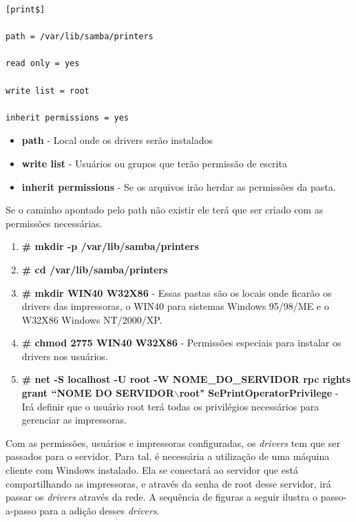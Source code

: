 \begin{lstlisting}[caption=Variáveis para compartilhamento onde deverão ficar os \textit{drivers} das impressoras,label={smb_print_driver}]	
[print$]

path = /var/lib/samba/printers

read only = yes

write list = root

inherit permissions = yes	
\end{lstlisting}

\begin{itemize}
	\item \textbf{path} - Local onde os drivers serão instalados
	\item \textbf{write list} - Usuários ou grupos que terão permissão de escrita
	\item \textbf{inherit permissions} - Se os arquivos irão herdar as permissões da pasta.
\end{itemize}

Se o caminho apontado pelo path não existir ele terá que ser criado com as permissões necessárias.

\begin{enumerate}
	\item \textbf{\# mkdir -p /var/lib/samba/printers}
	
	\item \textbf{\# cd /var/lib/samba/printers}
	\item \textbf{\# mkdir WIN40 W32X86} - Essas pastas são os locais onde ficarão os drivers das impressoras, o WIN40 para sistemas Windows 95/98/ME e o W32X86 Windows NT/2000/XP.
	\item \textbf{\# chmod 2775 WIN40 W32X86} - Permissões especiais para instalar os drivers nos usuários.
	\item \textbf{\# net -S localhost -U root -W NOME\_DO\_SERVIDOR  rpc rights grant ``NOME DO SERVIDOR$\backslash$root" SePrintOperatorPrivilege} - Irá definir que o usuário root terá todas os privilégios necessários para gerenciar as impressoras.
\end{enumerate}

Com as permissões, usuários e impressoras configuradas, os \textit{drivers} tem que ser passados para o servidor. Para tal, é necessária a utilização de uma máquina cliente com Windows instalado. Ela se conectará ao servidor que está compartilhando as impressoras, e através da senha de root desse servidor, irá passar os \textit{drivers} através da rede. A sequência de figuras a seguir ilustra o passo-a-passo para a adição desses \textit{drivers}.

